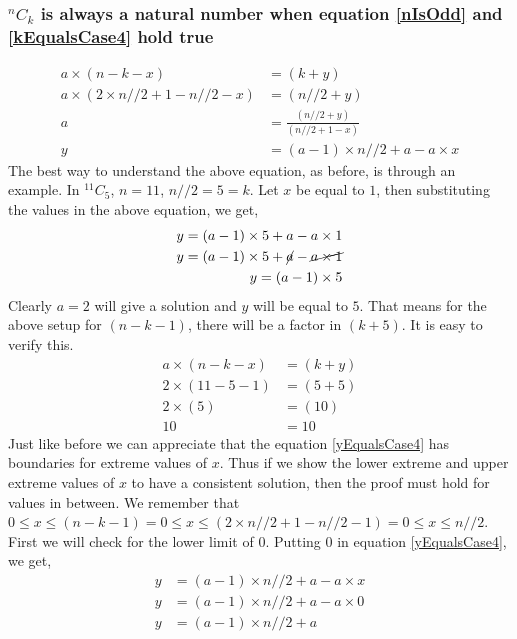 \documentclass[10pt, twoside]{article}
\newcommand*{\Combination}[2]{{}^{#1}C_{#2}}%
\begin{document}
\subsubsection{$\Combination{n}{k}$ is always a natural number when equation \eqref{nIsOdd} and \eqref{kEqualsCase4} hold true}\label{ProofkEqualsCase4}
\begin{align}
	a \times (n-k-x) &= (k+y) \nonumber \\
	a \times (2\times n//2 + 1 - n//2 - x) &= (n//2 + y) \nonumber \\
	a &= \frac{(n//2 + y)}{(n//2 + 1 - x)} \nonumber \\
	y &= (a-1)\times n//2 + a - a\times x \label{yEqualsCase4}	
\end{align}
The best way to understand the above equation, as before, is through an example.\newline
In $\Combination{11}{5}$, $n=11$, $n//2=5=k$. Let $x$ be equal to $1$, then substituting the values in the above equation, we get,
\begin{align*}
	y = (a-1)\times 5 + a - a\times 1 \\
	y = (a-1)\times 5 + \cancel{a} - \cancel{a\times 1} \\
	y = (a-1)\times 5
\end{align*}
Clearly $a = 2$ will give a solution and $y$ will be equal to $5$. That means for the above setup for $(n-k-1)$, there will be a factor in $(k+5)$. It is easy to verify this.\newline
\begin{align*}
	a \times (n-k-x) &= (k+y) \nonumber \\
	2 \times (11-5-1) &= (5+5) \nonumber \\
	2 \times (5) &= (10) \nonumber \\
	10 &= 10
\end{align*}
Just like before we can appreciate that the equation \eqref{yEqualsCase4} has boundaries for extreme values of $x$. Thus if we show the lower extreme and upper extreme values of $x$ to have a consistent solution, then the proof must hold for values in between.\newline
We remember that $0 \leq x \leq (n-k-1)=0 \leq x \leq (2\times n//2 + 1-n//2-1)=0 \leq x \leq n//2$. First we will check for the lower limit of $0$. Putting $0$ in equation \eqref{yEqualsCase4}, we get,
\begin{align*}
	y &= (a-1)\times n//2 + a - a\times x \\
	y &= (a-1)\times n//2 + a - a\times 0 \\
	y &= (a-1)\times n//2 + a \\
\end{align*}
\end{document}
